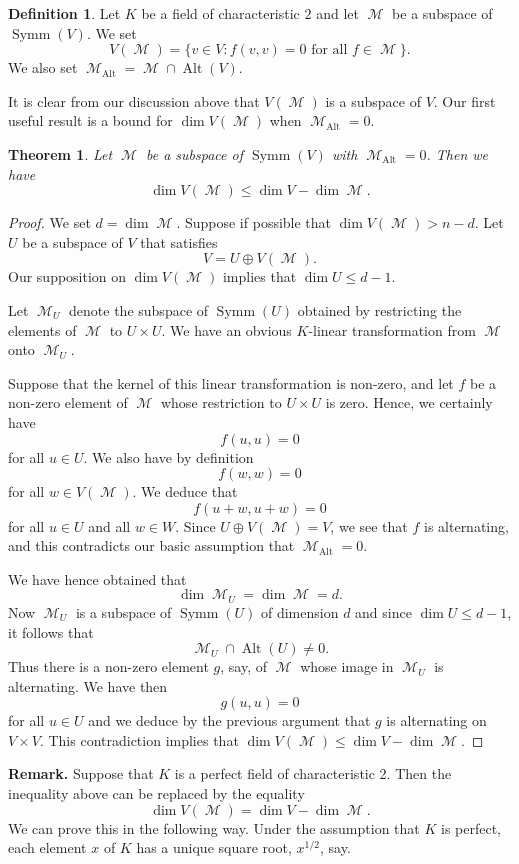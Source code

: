 \documentclass{amsart}
\DeclareMathOperator{\Alt}{Alt}
\DeclareMathOperator{\M}{\mathcal{M}}
\DeclareMathOperator{\Symm}{Symm}
\theoremstyle{plain}
\newtheorem{theorem}{Theorem}
\theoremstyle{definition}
\newtheorem{definition}{Definition}
\begin{document}
\begin{definition}
 
Let $K$ be a field of characteristic $2$ and let $\M$ be a subspace of $\Symm(V)$. We set
\[
 V(\M)=\{ v\in V: f(v,v)=0 \mbox{ for all } f\in \M\}.
\]
We also set $\M_{\Alt}=\M\cap \Alt(V)$.
\end{definition}


 It is clear from our discussion above that $V(\M)$ is a subspace of $V$. Our first useful result is a bound for $\dim V(\M)$ when $\M_{\Alt}=0$.

\begin{theorem} \label{dimension_bound_for_common_isotropic_points}
Let $\M$ be a subspace of $\Symm(V)$ with $\M_{\Alt}=0$. Then we have
\[
 \dim V(\M)\leq \dim V-\dim \M.
\]

\end{theorem}

\begin{proof}
We set $d=\dim \M$. Suppose if possible that $\dim V(\M)>n-d$. Let $U$ be a subspace of $V$ that satisfies
\[
 V=U\oplus V(\M).
\]
Our supposition on $\dim V(\M)$ implies that $\dim U\leq d-1$. 

Let $\M_U$ denote the subspace of $\Symm(U)$ obtained by restricting the elements of $\M$ to $U\times U$. We have an obvious $K$-linear
transformation from $\M$ onto $\M_U$. 

Suppose that the kernel of this linear transformation is non-zero, and let $f$ be a non-zero element of 
$\M$ whose restriction to $U\times U$ is zero. Hence, we certainly have
\[
 f(u,u)=0
\]
for all $u\in U$. We also have by definition 
\[
 f(w,w)=0
\]
for all $w\in V(\M)$. We deduce that
\[
 f(u+w,u+w)=0
\]
for all $u\in U$ and all $w\in W$. Since $U\oplus V(\M)=V$, we see that $f$ is alternating, and this contradicts our basic assumption that
$\M_{\Alt}=0$.

We have hence obtained that
\[
 \dim \M_U=\dim \M=d.
\]
Now $\M_U$ is a subspace of $\Symm(U)$ of dimension $d$ and since $\dim U\leq d-1$, it follows that
\[
 \M_U\cap \Alt(U)\neq 0.
\]
Thus there is a non-zero element $g$, say, of $\M$ whose image in $\M_U$ is alternating. We have then
\[
 g(u,u)=0
\]
for all $u\in U$ and we deduce by the previous argument that $g$ is alternating on $V\times V$. This contradiction implies that
$\dim V(\M)\leq \dim V-\dim \M$.
\end{proof}

\noindent\textbf {Remark.} Suppose that $K$ is a perfect field of characteristic 2. Then the inequality above can be replaced by the equality
\[
 \dim V(\M)=\dim V-\dim \M.
\]
We can prove this in the following way. Under the assumption that $K$ is perfect, each element $x$ of $K$ has a unique square root,
$x^{1/2}$, say. 
\end{document}
